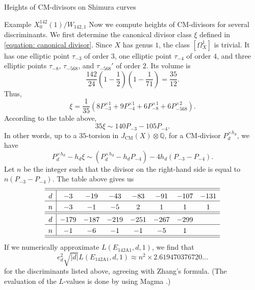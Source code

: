 \documentclass{amsart}
\theoremstyle{definition}
\def\Q{\mathbb Q}
\def\CM{\mathrm{CM}}
\begin{document}
\begin{section}{Heights of CM-divisors on Shimura curves}
\begin{subsection}{Example $X_0^{142}(1)/W_{142,1}$}
Now we compute heights of CM-divisors for several discriminants. We
first determine the canonical divisor class $\xi$ defined in
\eqref{equation: canonical divisor}. Since $X$ has genus
$1$, the class $[\Omega_X^1]$ is trivial. It has one elliptic point
$\tau_{-3}$ of order $3$, one elliptic point $\tau_{-4}$ of order $4$, and
three elliptic points $\tau_{-8}$, $\tau_{-568}$, and $\tau_{-568}'$ of
order $2$. Its volume is
$$
  \frac{142}{24}\left(1-\frac12\right)\left(1-\frac1{71}\right)
 =\frac{35}{12}.
$$
Thus,
$$
  \xi=\frac1{35}\left(8P_{-3}^{\times 1}+9P_{-4}^{\times 1}
  +6P_{-8}^{\times 1}+6P_{-568}^{\times 2}\right).
$$
According to the table above,
$$
  35\xi\sim 140P_{-3}-105P_{-4}.
$$
In other words, up to a $35$-torsion in
$J_\CM(X)\otimes\Q$, for a CM-divisor $P_d^{\times h_d}$,
we have
$$
  P_d^{\times h_d}-h_d\xi\sim(P_d^{\times h_d}-h_dP_{-4})-4h_d(P_{-3}-P_{-4}).
$$
Let $n$ be the integer such that the divisor on the right-hand side is
equal to $n(P_{-3}-P_{-4})$. The table above gives us
$$ \extrarowheight3pt
\begin{array}{c|ccccccc} \hline\hline
 d & -3 & -19 & -43 & -83 & -91 & -107 & -131 \\ \hline
 n & -3 &  -1 &  -5 &  2  &  1  &   1  &   1  \\ \hline\hline
 d & -179 & -187 & -219 & -251 & -267 & -299 & \\ \hline
 n &  -1  &  -6  &  -1  &  -1  &  -5  &   1  & \\ \hline\hline
\end{array}
$$
If we numerically approximate $L(E_{\mathrm{142A1}},d,1)$, we find
that
$$
  e_d^2\sqrt{|d|}L(E_{\mathrm{142A1}},d,1)\approx
  n^2\times 2.619470376720\ldots
$$
for the discriminants listed above, agreeing with Zhang's formula.
(The evaluation of the $L$-values is done by using Magma \cite{Magma}.)
\end{subsection}


\end{section}
\end{document}
